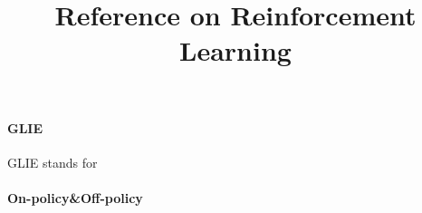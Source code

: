 \documentclass{article}[11pt]
\begin{document}
\title{\bf Reference on Reinforcement Learning}
\author{}
\date{}

\maketitle
\paragraph{GLIE} GLIE stands for 

\paragraph{On-policy\&Off-policy}



\end{document}

